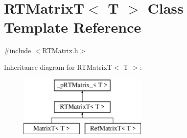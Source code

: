 \hypertarget{classRTMatrixT}{
\section{RTMatrixT$<$ T $>$ Class Template Reference}
\label{classRTMatrixT}
}


{\ttfamily \#include $<$RTMatrix.h$>$}

Inheritance diagram for RTMatrixT$<$ T $>$:\begin{figure}[H]
\begin{center}
\leavevmode
\includegraphics[height=3.000000cm]{classRTMatrixT}
\end{center}
\end{figure}
